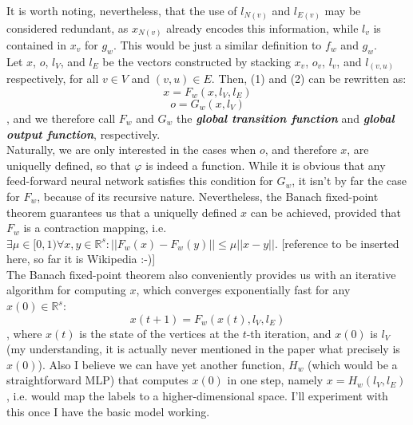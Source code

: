 \documentclass[12pt]{article}
\begin{document}
    \indent It is worth noting, nevertheless, that the use of $l_{N(v)}$ and $l_{E(v)}$ may be considered redundant,
    as $x_{N(v)}$ already encodes this information, while $l_v$ is contained in $x_v$ for $g_w$. This would be just a similar
    definition to $f_w$ and $g_w$.
    \\
    \indent Let $x$, $o$, $l_V$, and $l_E$ be the vectors constructed by stacking $x_v$, $o_v$, $l_v$, and $l_{(v, u)}$ respectively, for all $v \in V$
    and $(v, u) \in E$.
    Then, (1) and (2) can be rewritten as:
    \begin{equation}
        x = F_w(x, l_V, l_E)
    \end{equation}
    \begin{equation}
        o = G_w(x, l_V)
    \end{equation}
    , and we therefore call $F_w$ and $G_w$ the \textbf{\textit{global transition function}} and \textbf{\textit{global output function}}, respectively.
    \\
    \indent Naturally, we are only interested in the cases when $o$, and therefore $x$, are uniquelly defined, so that $\varphi$
    is indeed a function. While it is obvious that any feed-forward neural network satisfies this condition for $G_w$, it isn't
    by far the case for $F_w$, because of its recursive nature. Nevertheless, the Banach fixed-point theorem guarantees us that
    a uniquelly defined $x$ can be achieved, provided that $F_w$ is a contraction mapping, i.e. 
    $\exists \mu \in [0, 1) \forall x, y \in \mathbb{R}^s : ||F_w(x) - F_w(y)|| \leq \mu ||x - y||$. [reference to be inserted here, so far it is Wikipedia :-)]
    \\
    \indent The Banach fixed-point theorem also conveniently provides us with an iterative algorithm for 
    computing $x$, which converges exponentially fast for any $x(0) \in \mathbb{R}^s$:
    \begin{equation}
        x(t + 1) = F_w(x(t), l_V, l_E)
    \end{equation}
    , where $x(t)$ is the state of the vertices at the $t$-th iteration, and $x(0)$ is $l_V$ (my understanding, it is actually never mentioned in the paper what precisely is $x(0)$).
    Also I believe we can have yet another function, $H_w$ (which would be a straightforward MLP) that computes $x(0)$ in one step, namely $x = H_w(l_V, l_E)$, i.e. would map the labels to a higher-dimensional space. I'll experiment with this once I have the basic model working. 
\end{document}
